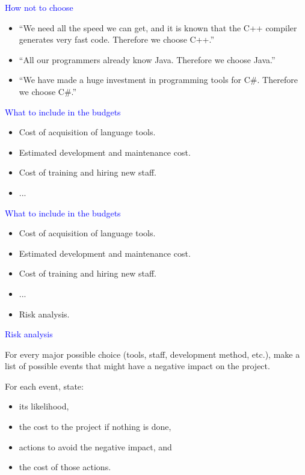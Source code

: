 \documentclass{slides}
\newcommand{\ti}[1]{\begin{center}\Large{\textcolor{blue}{#1}}\end{center}}
\begin{document}
\begin{slide}\ti{How not to choose}

  \begin{itemize}
  \item ``We need all the speed we can get, and it is known that the
    C++ compiler generates very fast code.  Therefore we choose C++.''
  \item ``All our programmers already know Java.  Therefore we choose
    Java.''
  \item ``We have made a huge investment in programming tools for
    C\#.  Therefore we choose C\#.''
  \end{itemize}

\vfill\end{slide}
\begin{slide}\ti{What to include in the budgets}

  \begin{itemize}
  \item Cost of acquisition of language tools.
  \item Estimated development and maintenance cost.
  \item Cost of training and hiring new staff.
  \item ...
  \end{itemize}

\vfill\end{slide}
\begin{slide}\ti{What to include in the budgets}

  \begin{itemize}
  \item Cost of acquisition of language tools.
  \item Estimated development and maintenance cost.
  \item Cost of training and hiring new staff.
  \item ...
  \item Risk analysis.
  \end{itemize}

\vfill\end{slide}
\begin{slide}\ti{Risk analysis}

For every major possible choice (tools, staff, development method,
etc.), make a list of possible events that might have a negative
impact on the project.

For each event, state:

\begin{itemize}
\item its likelihood,
\item the cost to the project if nothing is done,
\item actions to avoid the negative impact, and
\item the cost of those actions.
\end{itemize}

\vfill\end{slide}
\end{document}
